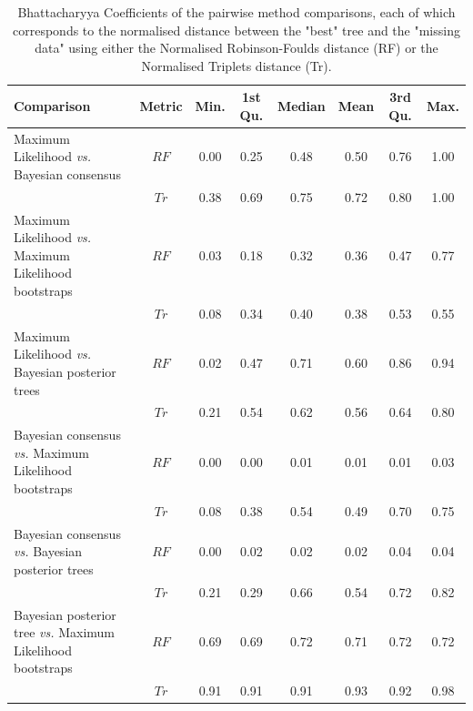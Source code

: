 \begin{landscape}
\begin{table}[ht]
\caption{Bhattacharyya Coefficients of the pairwise method comparisons, each of which corresponds to the normalised distance between the "best" tree and the "missing data" using either the Normalised Robinson-Foulds distance (RF) or the Normalised Triplets distance (Tr).}
\label{Tab_Supp_summary_BC_MF}
\centering
\begin{tabular}{lccccccc}
  \hline
 Comparison &  Metric & Min. & 1st Qu. & Median & Mean & 3rd Qu. & Max. \\  
  \hline
    Maximum Likelihood \textit{vs.} Bayesian consensus                 & $RF$ & 0.00 & 0.25 & 0.48 & 0.50 & 0.76 & 1.00 \\ 
                                                                       & $Tr$ & 0.38 & 0.69 & 0.75 & 0.72 & 0.80 & 1.00 \\ 
    Maximum Likelihood \textit{vs.} Maximum Likelihood bootstraps      & $RF$ & 0.03 & 0.18 & 0.32 & 0.36 & 0.47 & 0.77 \\ 
                                                                       & $Tr$ & 0.08 & 0.34 & 0.40 & 0.38 & 0.53 & 0.55 \\ 
    Maximum Likelihood \textit{vs.} Bayesian posterior trees           & $RF$ & 0.02 & 0.47 & 0.71 & 0.60 & 0.86 & 0.94 \\ 
                                                                       & $Tr$ & 0.21 & 0.54 & 0.62 & 0.56 & 0.64 & 0.80 \\ 
    Bayesian consensus \textit{vs.} Maximum Likelihood bootstraps      & $RF$ & 0.00 & 0.00 & 0.01 & 0.01 & 0.01 & 0.03 \\ 
                                                                       & $Tr$ & 0.08 & 0.38 & 0.54 & 0.49 & 0.70 & 0.75 \\ 
    Bayesian consensus \textit{vs.} Bayesian posterior trees           & $RF$ & 0.00 & 0.02 & 0.02 & 0.02 & 0.04 & 0.04 \\ 
                                                                       & $Tr$ & 0.21 & 0.29 & 0.66 & 0.54 & 0.72 & 0.82 \\ 
    Bayesian posterior tree \textit{vs.} Maximum Likelihood bootstraps & $RF$ & 0.69 & 0.69 & 0.72 & 0.71 & 0.72 & 0.72 \\ 
                                                                       & $Tr$ & 0.91 & 0.91 & 0.91 & 0.93 & 0.92 & 0.98 \\ 
   \hline
\end{tabular}
\end{table}
\end{landscape}

